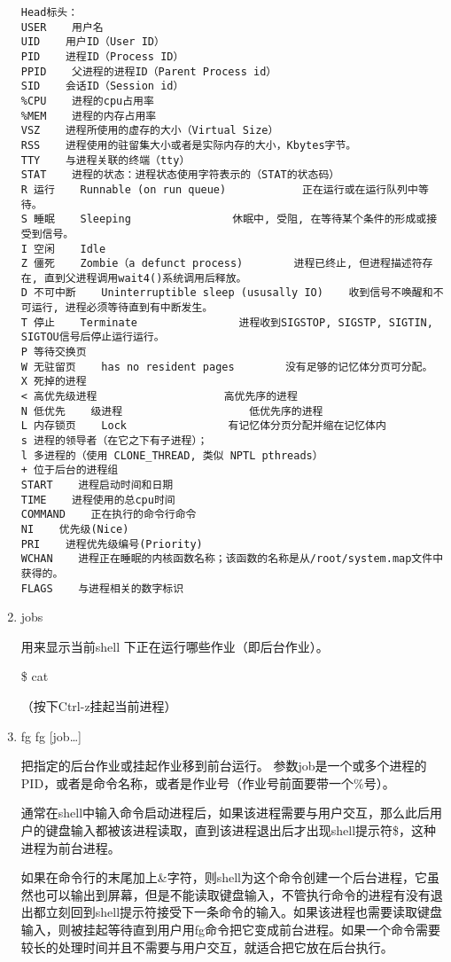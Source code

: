 \documentclass[11pt]{article}
\begin{document}
\begin{enumerate}
\begin{verbatim}
Head标头：
USER    用户名
UID    用户ID（User ID）
PID    进程ID（Process ID）
PPID    父进程的进程ID（Parent Process id）
SID    会话ID（Session id）
%CPU    进程的cpu占用率
%MEM    进程的内存占用率
VSZ    进程所使用的虚存的大小（Virtual Size）
RSS    进程使用的驻留集大小或者是实际内存的大小，Kbytes字节。
TTY    与进程关联的终端（tty）
STAT    进程的状态：进程状态使用字符表示的（STAT的状态码）
R 运行    Runnable (on run queue)            正在运行或在运行队列中等待。
S 睡眠    Sleeping                休眠中, 受阻, 在等待某个条件的形成或接受到信号。
I 空闲    Idle
Z 僵死    Zombie（a defunct process)        进程已终止, 但进程描述符存在, 直到父进程调用wait4()系统调用后释放。
D 不可中断    Uninterruptible sleep (ususally IO)    收到信号不唤醒和不可运行, 进程必须等待直到有中断发生。
T 停止    Terminate                进程收到SIGSTOP, SIGSTP, SIGTIN, SIGTOU信号后停止运行运行。
P 等待交换页
W 无驻留页    has no resident pages        没有足够的记忆体分页可分配。
X 死掉的进程
< 高优先级进程                    高优先序的进程
N 低优先    级进程                    低优先序的进程
L 内存锁页    Lock                有记忆体分页分配并缩在记忆体内
s 进程的领导者（在它之下有子进程）；
l 多进程的（使用 CLONE_THREAD, 类似 NPTL pthreads）
+ 位于后台的进程组 
START    进程启动时间和日期
TIME    进程使用的总cpu时间
COMMAND    正在执行的命令行命令
NI    优先级(Nice)
PRI    进程优先级编号(Priority)
WCHAN    进程正在睡眠的内核函数名称；该函数的名称是从/root/system.map文件中获得的。
FLAGS    与进程相关的数字标识
\end{verbatim}

\item jobs
\label{sec-1-1-8-3}

用来显示当前shell 下正在运行哪些作业（即后台作业）。 

\$ cat

（按下Ctrl-z挂起当前进程）

\item fg
\label{sec-1-1-8-4}
fg [job…]

把指定的后台作业或挂起作业移到前台运行。 参数job是一个或多个进程的PID，或者是命令名称，或者是作业号（作业号前面要带一个\%号）。 

通常在shell中输入命令启动进程后，如果该进程需要与用户交互，那么此后用户的键盘输入都被该进程读取，直到该进程退出后才出现shell提示符\$，这种进程为前台进程。 

如果在命令行的末尾加上\&字符，则shell为这个命令创建一个后台进程，它虽然也可以输出到屏幕，但是不能读取键盘输入，不管执行命令的进程有没有退出都立刻回到shell提示符接受下一条命令的输入。如果该进程也需要读取键盘输入，则被挂起等待直到用户用fg命令把它变成前台进程。如果一个命令需要较长的处理时间并且不需要与用户交互，就适合把它放在后台执行。


\end{enumerate}
\end{document}
